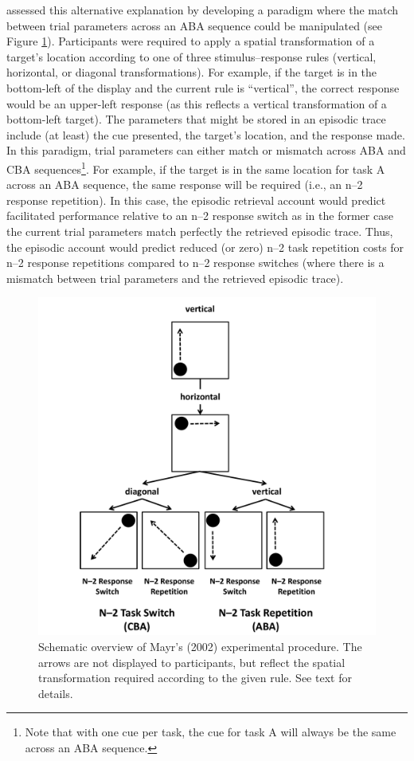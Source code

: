 \documentclass[a4paper, doc, natbib]{apa6}
\begin{document}
\cite{Mayr2002} assessed this alternative explanation by developing a paradigm where the match between trial parameters across an ABA sequence could be manipulated (see Figure \ref{fig:mayrExperiment}). Participants were required to apply a spatial transformation of a target's location according to one of three stimulus--response rules (vertical, horizontal, or diagonal transformations). For example, if the target is in the bottom-left of the display and the current rule is ``vertical'', the correct response would be an upper-left response (as this reflects a vertical transformation of a bottom-left target). The parameters that might be stored in an episodic trace include (at least) the cue presented, the target's location, and the response made. In this paradigm, trial parameters can either match or mismatch across ABA and CBA sequences\footnote{Note that with one cue per task, the cue for task A will always be the same across an ABA sequence.}. For example, if the target is in the same location for task A across an ABA sequence, the same response will be required (i.e., an n--2 response repetition). In this case, the episodic retrieval account would predict facilitated performance relative to an n--2 response switch as in the former case the current trial parameters match perfectly the retrieved episodic trace. Thus, the episodic account would predict reduced (or zero) n--2 task repetition costs for n--2 response repetitions compared to n--2 response switches (where there is a mismatch between trial parameters and the retrieved episodic trace).

\begin{figure}
\begin{center}
\includegraphics[width = \textwidth]{Images/mayrExperiment.pdf}
\caption{Schematic overview of Mayr's (2002) experimental procedure. The arrows are not displayed to participants, but reflect the spatial transformation required according to the given rule. See text for details.}
\label{fig:mayrExperiment}
\end{center}
\end{figure}
\end{document}

